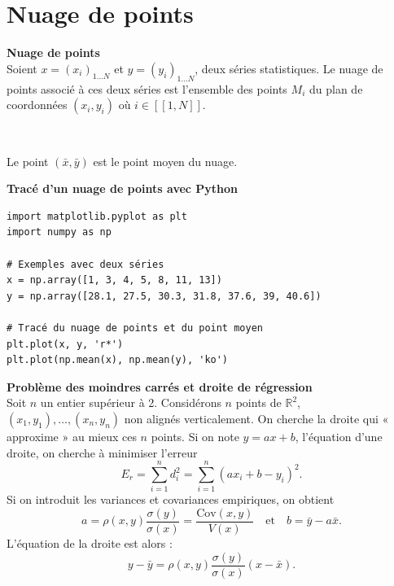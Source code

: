 \documentclass[../PolyS4.tex]{subfiles}
\begin{document}
\section{Nuage de points}

\begin{Def}\textbf{Nuage de points}\\

Soient $x = (x_i)_{1 \ldots N}$ et $y = (y_i)_{1 \ldots N}$, deux séries statistiques. Le nuage de points associé à ces deux séries est l'ensemble des points $M_i$ du plan de coordonnées $(x_i, y_i)$ où $i \in [[1, N]]$.
\end{Def}

\begin{Rmq}$\,$

Le point $(\bar{x}, \bar{y})$ est le point moyen du nuage.
\end{Rmq}

\begin{Meth}\textbf{Tracé d'un nuage de points avec Python}\\

\begin{verbatim}
import matplotlib.pyplot as plt
import numpy as np

# Exemples avec deux séries
x = np.array([1, 3, 4, 5, 8, 11, 13])
y = np.array([28.1, 27.5, 30.3, 31.8, 37.6, 39, 40.6])

# Tracé du nuage de points et du point moyen
plt.plot(x, y, 'r*')
plt.plot(np.mean(x), np.mean(y), 'ko')
\end{verbatim}
\end{Meth}

\begin{Prop}\textbf{Problème des moindres carrés et droite de régression}\\

Soit $n$ un entier supérieur à 2. Considérons $n$ points de $\mathbb{R}^2$, $(x_1, y_1), \ldots, (x_n, y_n)$ non alignés verticalement. On cherche la droite qui « approxime » au mieux ces $n$ points. Si on note $y = ax + b$, l'équation d'une droite, on cherche à minimiser l'erreur
\[
E_r = \sum_{i=1}^{n} d_i^2 = \sum_{i=1}^{n} (ax_i + b - y_i)^2.
\]
Si on introduit les variances et covariances empiriques, on obtient
\[
a = \rho(x, y) \frac{\sigma(y)}{\sigma(x)}=\frac{\text{Cov}(x,y)}{V(x)} \quad \text{et} \quad b = \bar{y} - a \bar{x}.
\]
L'équation de la droite est alors :
\[
y - \bar{y} = \rho(x, y) \frac{\sigma(y)}{\sigma(x)} (x - \bar{x}).
\]
\end{Prop}
\end{document}
